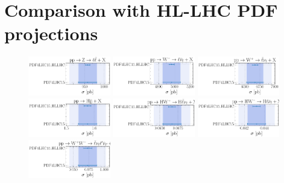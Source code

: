 \section{Comparison with HL-LHC PDF projections}
\label{app:comparisons_with_HLLHC}

\begin{figure}[!h]
	\centering
	\includegraphics[width=0.32\textwidth]{plots/LHCpheno/NNPDF_DY_14TEV_40_PHENO-integrated-HLLHC.pdf}
	\includegraphics[width=0.32\textwidth]{plots/LHCpheno/NNPDF_WM_14TEV_40_PHENO-integrated-HLLHC.pdf}
	\includegraphics[width=0.32\textwidth]{plots/LHCpheno/NNPDF_WP_14TEV_40_PHENO-integrated-HLLHC.pdf}
	\includegraphics[width=0.32\textwidth]{plots/LHCpheno/NNPDF_HVBF_14TEV_40_PHENO-integrated-HLLHC.pdf}
	\includegraphics[width=0.32\textwidth]{plots/LHCpheno/NNPDF_HWP_14TEV_40_PHENO-integrated-HLLHC.pdf}
	\includegraphics[width=0.32\textwidth]{plots/LHCpheno/NNPDF_HWM_14TEV_40_PHENO-integrated-HLLHC.pdf}
	\includegraphics[width=0.32\textwidth]{plots/LHCpheno/NNPDF_WPWM_14TEV_40_PHENO-integrated-HLLHC.pdf}

\end{figure}
